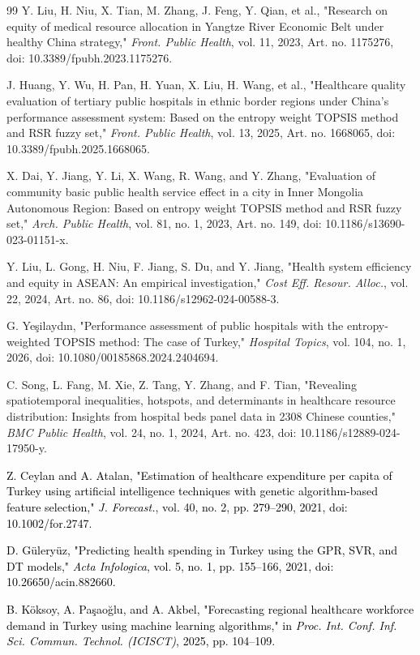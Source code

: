\documentclass[final, 9pt, twocolumn]{saucis}
\newcommand{\rev}[1]{\textcolor{black}{#1}}
\begin{document}
\begin{thebibliography}{99}
 Y. Liu, H. Niu, X. Tian, M. Zhang, J. Feng, Y. Qian, et al., "Research on equity of medical resource allocation in Yangtze River Economic Belt under healthy China strategy," \emph{Front. Public Health}, vol. 11, 2023, Art. no. 1175276, doi: 10.3389/fpubh.2023.1175276.

 J. Huang, Y. Wu, H. Pan, H. Yuan, X. Liu, H. Wang, et al., "Healthcare quality evaluation of tertiary public hospitals in ethnic border regions under China's performance assessment system: Based on the entropy weight TOPSIS method and RSR fuzzy set," \emph{Front. Public Health}, vol. 13, 2025, Art. no. 1668065, doi: 10.3389/fpubh.2025.1668065.

 X. Dai, Y. Jiang, Y. Li, X. Wang, R. Wang, and Y. Zhang, "Evaluation of community basic public health service effect in a city in Inner Mongolia Autonomous Region: Based on entropy weight TOPSIS method and RSR fuzzy set," \emph{Arch. Public Health}, vol. 81, no. 1, 2023, Art. no. 149, doi: 10.1186/s13690-023-01151-x.

 Y. Liu, L. Gong, H. Niu, F. Jiang, S. Du, and Y. Jiang, "Health system efficiency and equity in ASEAN: An empirical investigation," \emph{Cost Eff. Resour. Alloc.}, vol. 22, 2024, Art. no. 86, doi: 10.1186/s12962-024-00588-3.

 G. Yeşilaydın, "Performance assessment of public hospitals with the entropy-weighted TOPSIS method: The case of Turkey," \emph{Hospital Topics}, vol. 104, no. 1, 2026, doi: 10.1080/00185868.2024.2404694.

 C. Song, L. Fang, M. Xie, Z. Tang, Y. Zhang, and F. Tian, "Revealing spatiotemporal inequalities, hotspots, and determinants in healthcare resource distribution: Insights from hospital beds panel data in 2308 Chinese counties," \emph{BMC Public Health}, vol. 24, no. 1, 2024, Art. no. 423, doi: 10.1186/s12889-024-17950-y.

 \rev{Z. Ceylan and A. Atalan, "Estimation of healthcare expenditure per capita of Turkey using artificial intelligence techniques with genetic algorithm-based feature selection," \emph{J. Forecast.}, vol. 40, no. 2, pp. 279--290, 2021, doi: 10.1002/for.2747.}

 \rev{D. Güleryüz, "Predicting health spending in Turkey using the GPR, SVR, and DT models," \emph{Acta Infologica}, vol. 5, no. 1, pp. 155--166, 2021, doi: 10.26650/acin.882660.}

 \rev{B. Köksoy, A. Paşaoğlu, and A. Akbel, "Forecasting regional healthcare workforce demand in Turkey using machine learning algorithms," in \emph{Proc. Int. Conf. Inf. Sci. Commun. Technol. (ICISCT)}, 2025, pp. 104--109.}


\end{thebibliography}
\end{document}
